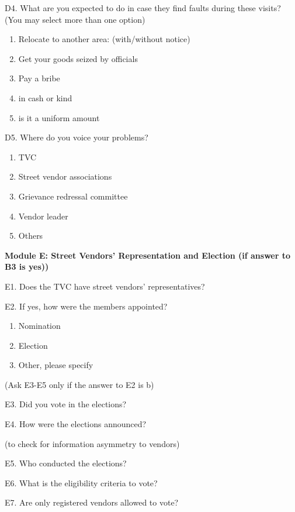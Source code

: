 \documentclass[a4paper, 12pt, twoside]{article}
\begin{document}
{{\begin{mdframed}[backgroundcolor=gray!20]
D4. What are you expected to do in case they find faults during these visits? (You may select more than one option)
\begin{enumerate}
\item Relocate to another area: (with/without notice)
\item Get your goods seized by officials
\item Pay a bribe
\item in cash or kind
\item is it a uniform amount
\end{enumerate}

D5. Where do you voice your problems?
\begin{enumerate}
\item TVC
\item Street vendor associations
\item Grievance redressal committee
\item Vendor leader
\item Others
\end{enumerate}

\textbf{Module E: Street Vendors’ Representation and Election (if answer to B3 is yes))}

E1. Does the TVC have street vendors’ representatives?

E2. If yes, how were the members appointed?
\begin{enumerate}
\item Nomination
\item Election
\item Other, please specify
\end{enumerate}

(Ask E3-E5 only if the answer to E2 is b)

E3. Did you vote in the elections?

E4. How were the elections announced?

       (to check for information asymmetry to vendors)

E5. Who conducted the elections?

E6. What is the eligibility criteria to vote?

E7. Are only registered vendors allowed to vote?

\end{mdframed}

\newpage
}}
\end{document}
